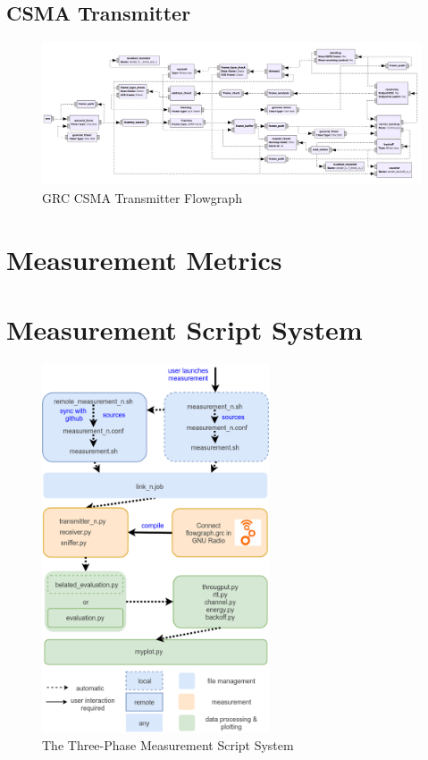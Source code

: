 \subsection{CSMA Transmitter}

\begin{figure}
	\label{fig:grc-csma-sender}
	\begin{center}
		\includegraphics[width=\textwidth]{pictures/grc_csma_transmitter_flowgraph}
\end{center}
\caption{GRC CSMA Transmitter Flowgraph}
\end{figure}

\clearpage

\section{Measurement Metrics}
\label{sec:measurement-metrics}

\section{Measurement Script System}
\label{sec:script-system}

\begin{figure}[ht]
	\label{fig:script-system}
	\begin{center}
		\includegraphics[width=0.6\textwidth]{pictures/script_system}
	\end{center}
	\caption{The Three-Phase Measurement Script System}
\end{figure}